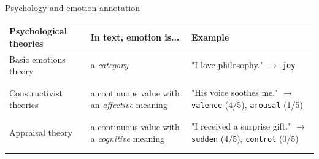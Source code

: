 \documentclass[handout,10pt]{beamer}
\newcommand{\smallcitet}[2][]{\text{\scriptsize \citet[#1]{#2}}} %
\begin{document}
\begin{frame}{Psychology and emotion annotation}







{\small
\begin{center}
\begin{tabular}{p{6.5em}p{10.5em}p{13.5em}}
\textbf{Psychological theories} & \textbf{In text, emotion is...} & \textbf{Example} \\
\hline
\addlinespace
Basic emotions theory & a \textit{category} & "I love philosophy." $\rightarrow$ \texttt{joy} \\
\addlinespace
\smallcitet{darwin_expression_1872,tomkins_affect_1962,ekman_basic_1999,plutchik} & & \\
\smallcitet{demszky-etal-2020-goemotions,greschner2025categoricalemotionsappraisals} & & \\ 
\addlinespace
\hline
\addlinespace
\pause
Constructivist theories & a continuous value with an \textit{affective} meaning & "His voice soothes me." $\rightarrow$ \texttt{valence} (4/5), \texttt{arousal} (1/5) \\
\addlinespace
\smallcitet{schachter_cognitive_1962,russell_core_1999} & & \\
\smallcitet{buechel-hahn-2017-emobank} & & \\
\addlinespace
\hline
\addlinespace
\pause
Appraisal theory& a continuous value with a \textit{cognitive} meaning & "I received a surprise gift." $\rightarrow$ \texttt{sudden} (4/5), \texttt{control} (0/5) \\ 
\smallcitet{arnold_emotion_1960,lazarus_progress_1991}  & & \\
\smallcitet{Troiano2023} & & \\
\end{tabular}
\end{center}
}


\end{frame}
\end{document}
